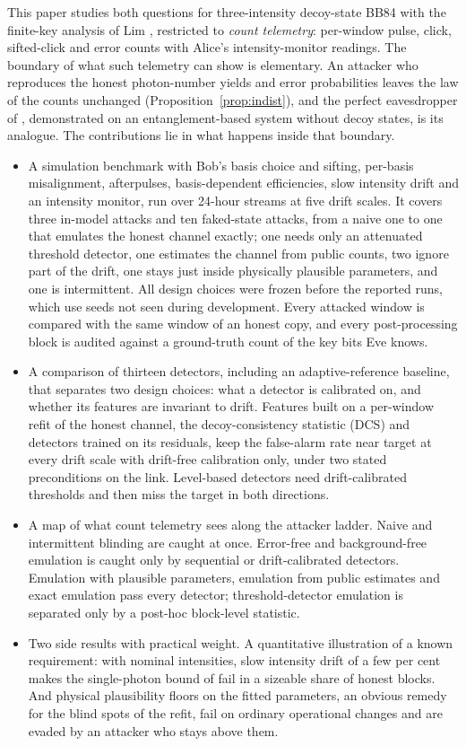 This paper studies both questions for three-intensity decoy-state BB84 with the finite-key analysis of Lim \etal \cite{lim2014}, restricted to \emph{count telemetry}: per-window pulse, click, sifted-click and error counts with Alice's intensity-monitor readings. The boundary of what such telemetry can show is elementary. An attacker who reproduces the honest photon-number yields and error probabilities leaves the law of the counts unchanged (Proposition~\ref{prop:indist}), and the perfect eavesdropper of \cite{gerhardt2011}, demonstrated on an entanglement-based system without decoy states, is its analogue. The contributions lie in what happens inside that boundary.
\begin{itemize}
\item A simulation benchmark with Bob's basis choice and sifting, per-basis misalignment, afterpulses, basis-dependent efficiencies, slow intensity drift and an intensity monitor, run over 24-hour streams at five drift scales. It covers three in-model attacks and ten faked-state attacks, from a naive one to one that emulates the honest channel exactly; one needs only an attenuated threshold detector, one estimates the channel from public counts, two ignore part of the drift, one stays just inside physically plausible parameters, and one is intermittent. All design choices were frozen before the reported runs, which use seeds not seen during development. Every attacked window is compared with the same window of an honest copy, and every post-processing block is audited against a ground-truth count of the key bits Eve knows.
\item A comparison of thirteen detectors, including an adaptive-reference baseline, that separates two design choices: what a detector is calibrated on, and whether its features are invariant to drift. Features built on a per-window refit of the honest channel, the decoy-consistency statistic (DCS) and detectors trained on its residuals, keep the false-alarm rate near target at every drift scale with drift-free calibration only, under two stated preconditions on the link. Level-based detectors need drift-calibrated thresholds and then miss the target in both directions.
\item A map of what count telemetry sees along the attacker ladder. Naive and intermittent blinding are caught at once. Error-free and background-free emulation is caught only by sequential or drift-calibrated detectors. Emulation with plausible parameters, emulation from public estimates and exact emulation pass every detector; threshold-detector emulation is separated only by a post-hoc block-level statistic.
\item Two side results with practical weight. A quantitative illustration of a known requirement: with nominal intensities, slow intensity drift of a few per cent makes the single-photon bound of \cite{lim2014} fail in a sizeable share of honest blocks. And physical plausibility floors on the fitted parameters, an obvious remedy for the blind spots of the refit, fail on ordinary operational changes and are evaded by an attacker who stays above them.
\end{itemize}

